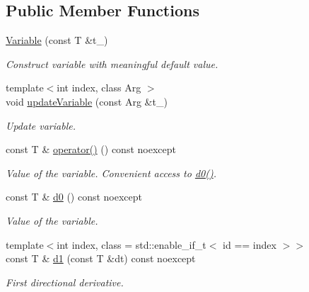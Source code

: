 \subsection*{Public Member Functions}
\begin{DoxyCompactItemize}
\item 
\hypertarget{structRFFGen_1_1Variable_a99bcfbe635b7a9c221d6ba3bb068921d}{\hyperlink{structRFFGen_1_1Variable_a99bcfbe635b7a9c221d6ba3bb068921d}{Variable} (const T \&t\-\_\-)}\label{structRFFGen_1_1Variable_a99bcfbe635b7a9c221d6ba3bb068921d}

\begin{DoxyCompactList}\small\item\em Construct variable with meaningful default value. \end{DoxyCompactList}\item 
\hypertarget{structRFFGen_1_1Variable_a5d6591b5a95842811ce015bbc98d8cb1}{{\footnotesize template$<$int index, class Arg $>$ }\\void \hyperlink{structRFFGen_1_1Variable_a5d6591b5a95842811ce015bbc98d8cb1}{update\-Variable} (const Arg \&t\-\_\-)}\label{structRFFGen_1_1Variable_a5d6591b5a95842811ce015bbc98d8cb1}

\begin{DoxyCompactList}\small\item\em Update variable. \end{DoxyCompactList}\item 
\hypertarget{structRFFGen_1_1Variable_af9705f9ea1deb1066db0edd317e12ec4}{const T \& \hyperlink{structRFFGen_1_1Variable_af9705f9ea1deb1066db0edd317e12ec4}{operator()} () const noexcept}\label{structRFFGen_1_1Variable_af9705f9ea1deb1066db0edd317e12ec4}

\begin{DoxyCompactList}\small\item\em Value of the variable. Convenient access to \hyperlink{structRFFGen_1_1Variable_abab2ca1e85b626e4bb656b97f899de74}{d0()}. \end{DoxyCompactList}\item 
\hypertarget{structRFFGen_1_1Variable_abab2ca1e85b626e4bb656b97f899de74}{const T \& \hyperlink{structRFFGen_1_1Variable_abab2ca1e85b626e4bb656b97f899de74}{d0} () const noexcept}\label{structRFFGen_1_1Variable_abab2ca1e85b626e4bb656b97f899de74}

\begin{DoxyCompactList}\small\item\em Value of the variable. \end{DoxyCompactList}\item 
{\footnotesize template$<$int index, class  = std\-::enable\-\_\-if\-\_\-t$<$ id == index $>$$>$ }\\const T \& \hyperlink{structRFFGen_1_1Variable_a7950779c766f047ead4baa03ebaca3bc}{d1} (const T \&dt) const noexcept
\begin{DoxyCompactList}\small\item\em First directional derivative. \end{DoxyCompactList}\end{DoxyCompactItemize}


